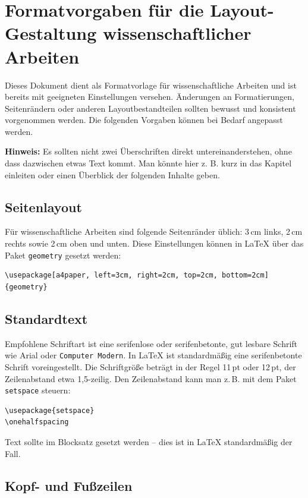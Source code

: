 \section{Formatvorgaben für die Layout-Gestaltung wissenschaftlicher Arbeiten}

Dieses Dokument dient als Formatvorlage für wissenschaftliche Arbeiten und ist bereits mit geeigneten Einstellungen versehen. Änderungen an Formatierungen, Seitenrändern oder anderen Layoutbestandteilen sollten bewusst und konsistent vorgenommen werden. Die folgenden Vorgaben können bei Bedarf angepasst werden.

\textbf{Hinweis:} Es sollten nicht zwei Überschriften direkt untereinanderstehen, ohne dass dazwischen etwas Text kommt. Man könnte hier z. B. kurz in das Kapitel einleiten oder einen
Überblick der folgenden Inhalte geben.

\subsection{Seitenlayout}

Für wissenschaftliche Arbeiten sind folgende Seitenränder üblich: 3\,cm links, 2\,cm rechts sowie 2\,cm oben und unten. Diese Einstellungen können in LaTeX über das Paket \verb|geometry| gesetzt werden:

\begin{verbatim}
\usepackage[a4paper, left=3cm, right=2cm, top=2cm, bottom=2cm]{geometry}
\end{verbatim}

\subsection{Standardtext}

Empfohlene Schriftart ist eine serifenlose oder serifenbetonte, gut lesbare Schrift wie \textsf{Arial} oder \texttt{Computer Modern}. In LaTeX ist standardmäßig eine serifenbetonte Schrift voreingestellt. Die Schriftgröße beträgt in der Regel 11\,pt oder 12\,pt, der Zeilenabstand etwa 1{,}5-zeilig. Den Zeilenabstand kann man z.\,B. mit dem Paket \verb|setspace| steuern:

\begin{verbatim}
\usepackage{setspace}
\onehalfspacing
\end{verbatim}

Text sollte im Blocksatz gesetzt werden – dies ist in LaTeX standardmäßig der Fall.

\subsection{Kopf- und Fußzeilen}

